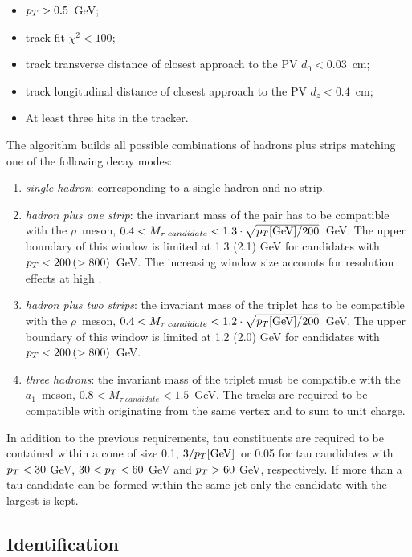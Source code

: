 \begin{itemize}
\item $p_{T} > 0.5$\ GeV;
\item track fit $\chi^2 < 100$;
\item track transverse distance of closest approach to the PV $d_0 < 0.03$\ cm;
\item track longitudinal distance of closest approach to the PV $d_z < 0.4$\ cm;
\item At least three hits in the tracker.
\end{itemize}

The algorithm builds all possible combinations of hadrons plus strips matching one of the following decay modes:

\begin{enumerate}
\item \emph{single hadron}: corresponding to a single hadron and no strip.
\item \emph{hadron plus one strip}: the invariant mass of the pair has to be compatible with the $\rho$\ meson, $0.4 < M_{\tau \; candidate} < 1.3 \cdot \sqrt{p_{T} \mathrm{[GeV]} / 200}$\ GeV. The upper boundary of this window is limited at 1.3 (2.1) GeV for candidates with $p_{T} < 200 \, (> 800)$~GeV. The increasing window size accounts for resolution effects at high \pT.
\item \emph{hadron plus two strips}: the invariant mass of the triplet has to be compatible with the $\rho$\ meson, $0.4 < M_{\tau \; candidate} < 1.2 \cdot \sqrt{p_{T} \mathrm{[GeV]} / 200}$\ GeV. The upper boundary of this window is limited at 1.2 (2.0) GeV for candidates with $p_{T} < 200 \, (> 800)$~GeV.
\item \emph{three hadrons}: the invariant mass of the triplet must be compatible with the $a_1$\ meson, $0.8 < M_{\tau \; candidate} < 1.5$\ GeV. The tracks are required to be compatible with originating from the same vertex and to sum to unit charge.
\end{enumerate}

In addition to the previous requirements, tau constituents are required to be contained within a cone of size 0.1, $3 / p_{T} \mathrm{[GeV]}$\ or 0.05 for tau candidates with $p_{T} < 30$ GeV, $30 < p_{T} < 60$ GeV and $p_{T} > 60$ GeV, respectively. If more than a tau candidate can be formed within the same jet only the candidate with the largest \pT is kept.

\subsection{Identification}

